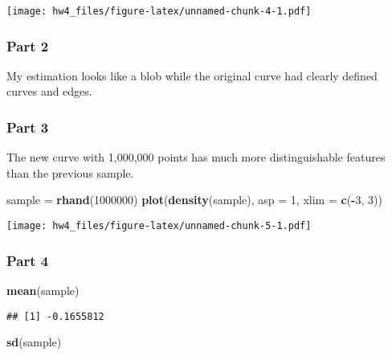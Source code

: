 \documentclass[
]{article}
\newenvironment{Shaded}{\begin{snugshade}}{\end{snugshade}}
\newcommand{\DataTypeTok}[1]{\textcolor[rgb]{0.13,0.29,0.53}{#1}}
\newcommand{\DecValTok}[1]{\textcolor[rgb]{0.00,0.00,0.81}{#1}}
\newcommand{\KeywordTok}[1]{\textcolor[rgb]{0.13,0.29,0.53}{\textbf{#1}}}
\newcommand{\NormalTok}[1]{#1}
\newcommand{\OperatorTok}[1]{\textcolor[rgb]{0.81,0.36,0.00}{\textbf{#1}}}
\newcommand{\StringTok}[1]{\textcolor[rgb]{0.31,0.60,0.02}{#1}}
\begin{document}
\texttt{[image: hw4\_files/figure-latex/unnamed-chunk-4-1.pdf]}

\hypertarget{part-2}{%
\subsubsection{Part 2}\label{part-2}}

My estimation looks like a blob while the original curve had clearly
defined curves and edges.

\hypertarget{part-3}{%
\subsubsection{Part 3}\label{part-3}}

The new curve with 1,000,000 points has much more distinguishable
features than the previous sample.

\begin{Shaded}
\begin{Highlighting}[]
\NormalTok{sample =}\StringTok{ }\KeywordTok{rhand}\NormalTok{(}\DecValTok{1000000}\NormalTok{)}
\KeywordTok{plot}\NormalTok{(}\KeywordTok{density}\NormalTok{(sample), }\DataTypeTok{asp =} \DecValTok{1}\NormalTok{, }\DataTypeTok{xlim =} \KeywordTok{c}\NormalTok{(}\OperatorTok{{-}}\DecValTok{3}\NormalTok{, }\DecValTok{3}\NormalTok{))}
\end{Highlighting}
\end{Shaded}

\texttt{[image: hw4\_files/figure-latex/unnamed-chunk-5-1.pdf]}

\hypertarget{part-4}{%
\subsubsection{Part 4}\label{part-4}}

\begin{Shaded}
\begin{Highlighting}[]
\KeywordTok{mean}\NormalTok{(sample)}
\end{Highlighting}
\end{Shaded}

\begin{verbatim}
## [1] -0.1655812
\end{verbatim}

\begin{Shaded}
\begin{Highlighting}[]
\KeywordTok{sd}\NormalTok{(sample)}
\end{Highlighting}
\end{Shaded}
\end{document}
